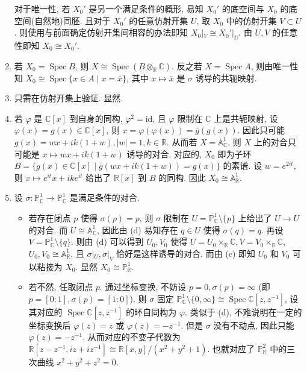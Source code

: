 \documentclass{article}
\theoremstyle{exercise}
\theoremstyle{plain}
\theoremstyle{remark}
\newenvironment{proofc}{\proof}{\endproof}
\def\A{\mathbb{A}}
\def\P{\mathbb{P}}
\def\R{\mathbb{R}}
\def\C{\mathbb{C}}
\def\id{\mathrm{id}}
\def\Spec{\operatorname{Spec}}
\begin{document}
\begin{proofc}
\begin{enumerate}[label=(\alph*)]
          对于唯一性, 若 $X_0'$ 是另一个满足条件的概形,
          易知 $X_0'$ 的底空间与 $X_0$ 的底空间(自然地)同胚.
          且对于 $X_0'$ 的任意仿射开集 $U$, 取 $X_0$ 中的仿射开集 $V \subset U$.
          则使用与前面确定仿射开集间相容的办法即知 $X_0|_V \cong X_0'|_U$.
          由 $U, V$ 的任意性即知 $X_0 \cong X_0'$.
    \item 若 $X_0 = \Spec B$, 则 $X \cong \Spec (B \otimes_{\R} \C)$.
          反之若 $X = \Spec A$, 则由唯一性知 $X_0 \cong \Spec \{ x \in A \mid x = \bar x \}$,
          其中 $x \mapsto \bar{x}$ 是 $\sigma$ 诱导的共轭映射.
    \item 只需在仿射开集上验证. 显然.
    \item 若 $\varphi$ 是 $\C[x]$ 到自身的同构,
          $\varphi^2 = \id$, 且 $\varphi$ 限制在 $\C$ 上是共轭映射,
          设 $\varphi(x) = g(x) \in \C[x]$, 则 $x = \varphi(\varphi(x)) = \bar{g}(g(x))$.
          因此只可能 $g(x) = wx + ik(1 + w), \lvert w \rvert = 1, k \in \R$.
          从而若 $X = \A_{\C}^1$, 则 $X$ 上的对合只可能是 $x \mapsto wx + ik(1 + w)$ 诱导的对合.
          对应的,
          $X_0$ 即为子环 $B = \{ g(x) \in \C[x] \mid \bar{g}(wx + ik(1 + w)) = g(x) \}$ 的素谱.
          设 $w = e^{2it}$, 则 $x \mapsto e^{it}x + ike^{it}$
          给出了 $\R[x]$ 到 $B$ 的同构. 因此 $X_0 \cong \A_{\R}^1$.
    \item 设 $\sigma \colon \P_{\C}^1 \to \P_{\C}^1$ 是满足条件的对合.
          \begin{itemize}
            \item 若存在闭点 $p$ 使得 $\sigma(p) = p$,
                  则 $\sigma$ 限制在 $U = \P_{\C}^1 \setminus \{p\}$ 上给出了 $U \to U$ 的对合.
                  而 $U \cong \A_{\C}^1$, 因此由 (d) 易知存在 $q \in U$ 使得 $\sigma(q) = q$.
                  再设 $V = \P_{\C}^1 \setminus \{q\}$.
                  则由 (d) 可以得到 $U_0, V_0$ 使得 $U = U_0 \times_{\R} \C, V = V_0 \times_{\R} \C$,
                  $U_0, V_0 \cong \A_{\R}^1$.
                  且 $\sigma|_U, \sigma|_V$ 恰好是这样诱导的对合.
                  而由 (c) 即知 $U_0$ 和 $V_0$ 可以粘接为 $X_0$.
                  显然 $X_0 \cong \P_{\R}^1$.
            \item 若不然, 任取闭点 $p$. 通过坐标变换, 不妨设 $p = 0, \sigma(p) = \infty$
                  (即 $p = [0 : 1], \sigma(p) = [1 : 0]$).
                  则 $\sigma$ 固定 $\P_{\C}^1 \setminus \{ 0, \infty \} \cong \Spec \C[z, z^{-1}]$,
                  设其对应的 $\Spec \C[z, z^{-1}]$ 的环自同构为 $\varphi$.
                  类似于 (d), 不难说明在一定的坐标变换后 $\varphi(z) = z$ 或 $\varphi(z) = -z^{-1}$.
                  但是 $\sigma$ 没有不动点, 因此只能 $\varphi(z) = -z^{-1}$.
                  从而对应的不变子代数为
                  $\R[z - z^{-1}, iz + iz^{-1}] \cong \R[x, y] / (x^2 + y^2 + 1)$.
                  也就对应了 $\P_{\R}^2$ 中的三次曲线 $x^2 + y^2 + z^2 = 0$. \qedhere
          \end{itemize}
  \end{enumerate}
\end{proofc}
\end{document}
